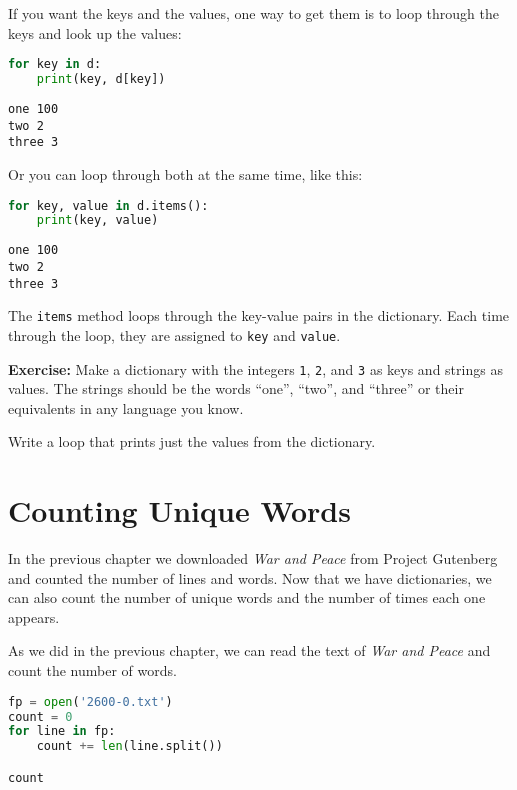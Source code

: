 If you want the keys and the values, one way to get them is to loop
through the keys and look up the values:

\begin{lstlisting}[language=Python,style=source]
for key in d:
    print(key, d[key])
\end{lstlisting}

\begin{lstlisting}[style=output]
one 100
two 2
three 3
\end{lstlisting}

Or you can loop through both at the same time, like this:

\begin{lstlisting}[language=Python,style=source]
for key, value in d.items():
    print(key, value)
\end{lstlisting}

\begin{lstlisting}[style=output]
one 100
two 2
three 3
\end{lstlisting}

The \passthrough{\lstinline!items!} method loops through the key-value
pairs in the dictionary. Each time through the loop, they are assigned
to \passthrough{\lstinline!key!} and \passthrough{\lstinline!value!}.

\textbf{Exercise:} Make a dictionary with the integers
\passthrough{\lstinline!1!}, \passthrough{\lstinline!2!}, and
\passthrough{\lstinline!3!} as keys and strings as values. The strings
should be the words ``one'', ``two'', and ``three'' or their equivalents
in any language you know.

Write a loop that prints just the values from the dictionary.

\section{Counting Unique Words}\label{counting-unique-words}

In the previous chapter we downloaded \emph{War and Peace} from Project
Gutenberg and counted the number of lines and words. Now that we have
dictionaries, we can also count the number of unique words and the
number of times each one appears.

As we did in the previous chapter, we can read the text of \emph{War and
Peace} and count the number of words.

\begin{lstlisting}[language=Python,style=source]
fp = open('2600-0.txt')
count = 0
for line in fp:
    count += len(line.split())

count
\end{lstlisting}

